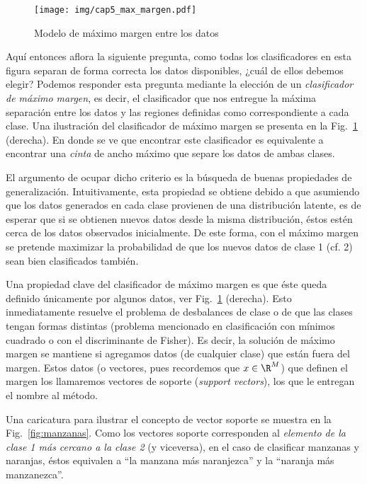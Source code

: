 \begin{figure}[ht]
    \centering
    \texttt{[image: img/cap5\_max\_margen.pdf]}
    \caption{Modelo de máximo margen entre los datos}
    \label{fig:maxim_marg} 
\end{figure}

Aquí entonces aflora la siguiente pregunta, como todas los clasificadores en esta figura separan de forma correcta los datos disponibles, ¿cuál de ellos debemos elegir? Podemos responder esta pregunta mediante la elección de un \emph{clasificador de máximo margen}, es decir, el clasificador que nos entregue la máxima separación entre los datos y las regiones definidas como correspondiente a cada clase. Una ilustración del clasificador de máximo margen se presenta en la Fig.~\ref{fig:maxim_marg} (derecha). En donde se ve que encontrar este clasificador es equivalente a encontrar una \emph{cinta} de ancho máximo que separe los datos de ambas clases.


El argumento de ocupar dicho criterio es la búsqueda de buenas propiedades de generalización. Intuitivamente, esta propiedad se obtiene debido a que asumiendo que los datos generados en cada clase  provienen de una distribución latente, es de esperar que si se obtienen nuevos datos desde la misma distribución, éstos estén cerca de los datos observados inicialmente. De este forma, con el máximo margen se pretende maximizar la probabilidad de que los nuevos datos de clase 1 (cf. 2) sean bien clasificados también.

Una propiedad clave del clasificador de máximo margen es que éste queda definido únicamente por algunos datos, ver Fig.~\ref{fig:maxim_marg} (derecha). Esto inmediatamente resuelve el problema de desbalances de clase o de que las clases tengan formas distintas (problema mencionado en clasificación con mínimos cuadrado o con el discriminante de Fisher). Es decir, la solución de máximo margen se mantiene si agregamos datos (de cualquier clase) que están fuera del margen. Estos datos (o vectores, pues recordemos que $x\in\R^M$) que definen el margen los llamaremos vectores de soporte (\emph{support vectors}), los que le entregan el nombre al método. 

Una caricatura para ilustrar el concepto de vector soporte se muestra en la Fig.~\ref{fig:manzanas}. Como los vectores soporte corresponden al \emph{elemento de la clase 1 más cercano a la clase 2} (y viceversa), en el caso de clasificar manzanas y naranjas, éstos equivalen a ``la manzana más naranjezca'' y la ``naranja más manzanezca''. 


